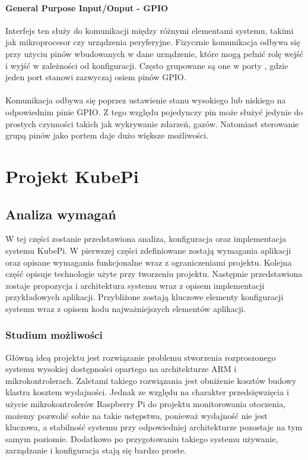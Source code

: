 \documentclass[12pt]{report}
\let\Oldsection\section
\renewcommand{\section}{\FloatBarrier\Oldsection}
\let\Oldsubsection\subsection
\renewcommand{\subsection}{\FloatBarrier\Oldsubsection}
\let\Oldsubsubsection\subsubsection
\renewcommand{\subsubsection}{\FloatBarrier\Oldsubsubsection}
\begin{document}
{\subsubsection{General Purpose Input/Onput - GPIO}
Interfejs ten służy do komunikacji między różnymi elementami systemu, takimi jak mikroprocesor czy urządzenia peryferyjne. Fizycznie komunikacja odbywa się przy użyciu pinów wbudowanych w dane urządzenie, które mogą pełnić rolę wejść i wyjść w zależności od konfiguracji. Często grupowane są one w porty , gdzie jeden port stanowi zazwyczaj osiem pinów GPIO. \\ \\
Komunikacja odbywa się poprzez ustawienie stanu wysokiego lub niskiego na odpowiednim pinie GPIO. Z tego względu pojedynczy pin może służyć jedynie do prostych czynności takich jak wykrywanie zdarzeń, gazów. Natomiast sterowanie grupą pinów jako portem daje dużo większe możliwości.
\chapter{Projekt KubePi} \label{project}
\section{Analiza wymagań}
W tej części zostanie przedstawiona analiza, konfiguracja oraz implementacja systemu KubePi. W pierwszej części zdefiniowane zostają wymagania aplikacji oraz opisane wymagania funkcjonalne wraz z ograniczeniami projektu. Kolejna część opisuje technologie użyte przy tworzeniu projektu. Następnie przedstawiona zostaje propozycja i architektura systemu wraz z opisem implementacji przykładowych aplikacji. Przybliżone zostają kluczowe elementy konfiguracji systemu wraz z opisem kodu najważniejszych elementów aplikacji.

\subsection{Studium możliwości}
Główną ideą projektu jest rozwiązanie problemu stworzenia rozproszonego systemu wysokiej dostępności opartego na architekturze ARM i mikrokontrolerach. Zaletami takiego rozwiązania jest obniżenie kosztów budowy klastra kosztem wydajności. Jednak ze względu na charakter przedsięwzięcia i użycie mikrokontrolerów Raspberry Pi do projektu monitorowania otoczenia, możemy pozwolić sobie na takie ustępstwa, ponieważ wydajność nie jest kluczowa, a stabilność systemu przy odpowiedniej architekturze pozostaje na tym samym poziomie. Dodatkowo po przygotowaniu takiego systemu używanie, zarządzanie i konfiguracja stają się bardzo proste.

}
\end{document}
